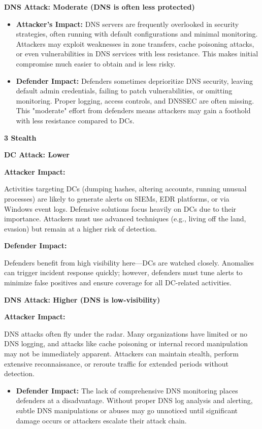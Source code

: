 \textbf{DNS Attack: Moderate (DNS is often less protected)}

\begin{itemize}
    \item \textbf{\textbf{Attacker’s Impact:}}
DNS servers are frequently overlooked in security strategies, often running with default configurations and minimal monitoring. Attackers may exploit weaknesses in zone transfers, cache poisoning attacks, or even vulnerabilities in DNS services with less resistance. This makes initial compromise much easier to obtain and is less risky.

    \item \textbf{\textbf{Defender Impact:}}
Defenders sometimes deprioritize DNS security, leaving default admin credentials, failing to patch vulnerabilities, or omitting monitoring. Proper logging, access controls, and DNSSEC are often missing. This "moderate" effort from defenders means attackers may gain a foothold with less resistance compared to DCs.

\end{itemize}
\textbf{3 Stealth}

\textbf{DC Attack: Lower}

\textbf{Attacker Impact:}

Activities targeting DCs (dumping hashes, altering accounts, running unusual processes) are likely to generate alerts on SIEMs, EDR platforms, or via Windows event logs. Defensive solutions focus heavily on DCs due to their importance. Attackers must use advanced techniques (e.g., living off the land, evasion) but remain at a higher risk of detection.

\textbf{Defender Impact:}

Defenders benefit from high visibility here—DCs are watched closely. Anomalies can trigger incident response quickly; however, defenders must tune alerts to minimize false positives and ensure coverage for all DC-related activities.

\textbf{DNS Attack: Higher (DNS is low-visibility)}

\textbf{Attacker Impact:}

DNS attacks often fly under the radar. Many organizations have limited or no DNS logging, and attacks like cache poisoning or internal record manipulation may not be immediately apparent. Attackers can maintain stealth, perform extensive reconnaissance, or reroute traffic for extended periods without detection.

\begin{itemize}
    \item \textbf{\textbf{Defender Impact:}}
The lack of comprehensive DNS monitoring places defenders at a disadvantage. Without proper DNS log analysis and alerting, subtle DNS manipulations or abuses may go unnoticed until significant damage occurs or attackers escalate their attack chain.

\end{itemize}

